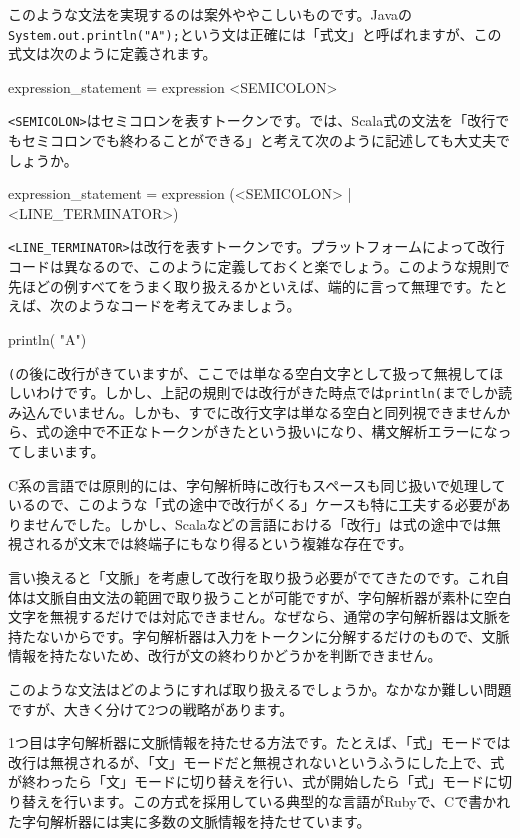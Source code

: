 このような文法を実現するのは案外ややこしいものです。Javaの\texttt{System.out.println("A");}という文は正確には「式文」と呼ばれますが、この式文は次のように定義されます。

\begin{codescreen}{}
expression_statement = expression <SEMICOLON>
\end{codescreen}

\texttt{\textless{}SEMICOLON\textgreater{}}はセミコロンを表すトークンです。では、Scala式の文法を「改行でもセミコロンでも終わることができる」と考えて次のように記述しても大丈夫でしょうか。

\begin{codescreen}{}
expression_statement = expression (<SEMICOLON> | <LINE_TERMINATOR>)
\end{codescreen}

\texttt{\textless{}LINE\_TERMINATOR\textgreater{}}は改行を表すトークンです。プラットフォームによって改行コードは異なるので、このように定義しておくと楽でしょう。このような規則で先ほどの例すべてをうまく取り扱えるかといえば、端的に言って無理です。たとえば、次のようなコードを考えてみましょう。

\begin{codescreen}{}
println(
  "A")
\end{codescreen}

\texttt{(}の後に改行がきていますが、ここでは単なる空白文字として扱って無視してほしいわけです。しかし、上記の規則では改行がきた時点では\texttt{println(}までしか読み込んでいません。しかも、すでに改行文字は単なる空白と同列視できませんから、式の途中で不正なトークンがきたという扱いになり、構文解析エラーになってしまいます。

C系の言語では原則的には、字句解析時に改行もスペースも同じ扱いで処理しているので、このような「式の途中で改行がくる」ケースも特に工夫する必要がありませんでした。しかし、Scalaなどの言語における「改行」は式の途中では無視されるが文末では終端子にもなり得るという複雑な存在です。

言い換えると「文脈」を考慮して改行を取り扱う必要がでてきたのです。これ自体は文脈自由文法の範囲で取り扱うことが可能ですが、字句解析器が素朴に空白文字を無視するだけでは対応できません。なぜなら、通常の字句解析器は文脈を持たないからです。字句解析器は入力をトークンに分解するだけのもので、文脈情報を持たないため、改行が文の終わりかどうかを判断できません。

このような文法はどのようにすれば取り扱えるでしょうか。なかなか難しい問題ですが、大きく分けて2つの戦略があります。

1つ目は字句解析器に文脈情報を持たせる方法です。たとえば、「式」モードでは改行は無視されるが、「文」モードだと無視されないというふうにした上で、式が終わったら「文」モードに切り替えを行い、式が開始したら「式」モードに切り替えを行います。この方式を採用している典型的な言語がRubyで、Cで書かれた字句解析器には実に多数の文脈情報を持たせています。

